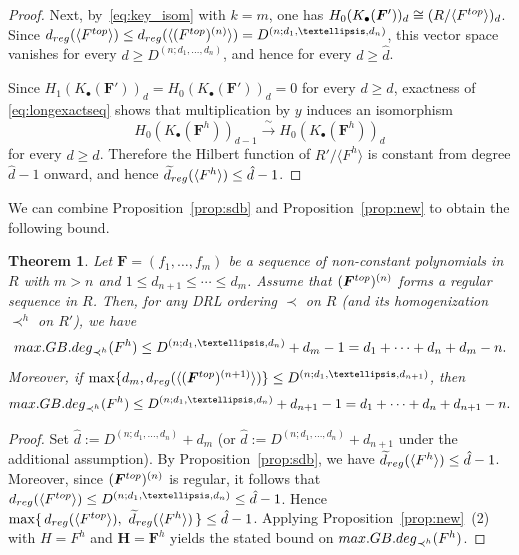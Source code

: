 \documentclass{article}
\newtheorem{theorem}{Theorem}[subsection]
\theoremstyle{definition}
\theoremstyle{plain}
\theoremstyle{plain}
\theoremstyle{plain}
\theoremstyle{plain}
\numberwithin{equation}{subsection}
\begin{document}
\begin{proof}
Next, by~\eqref{eq:key_isom} with $k=m$, one has $H_0(K_\bullet(\bm F'))_d \cong(R/\langle F^{\rm top}\rangle)_d$.
Since $d_{\rm reg}(\langle F^{\rm top}\rangle) \leq d_{\rm reg}(\langle(F^{\rm top})^{(n)}\rangle) = D^{(n;d_1,\ldots,d_n)}$, this vector space vanishes for every $d\geq D^{(n;d_1,\ldots,d_n)}$, and hence for every $d\geq\hat d$.

Since $H_1(K_\bullet(\bm F'))_d=H_0(K_\bullet(\bm F'))_d=0$ for every $d\geq\hat d$, exactness of \eqref{eq:longexactseq} shows that multiplication by $y$ induces an isomorphism
\[
H_0(K_\bullet(\bm F^h))_{d-1}\xrightarrow{\ \sim\ }H_0(K_\bullet(\bm F^h))_d
\]
for every $d\geq\hat d$.
Therefore the Hilbert function of $R'/\langle F^h\rangle$ is constant from degree $\hat d-1$ onward, and hence $\widetilde d_{\rm reg}(\langle F^h\rangle)\leq\hat d-1$.
\end{proof}

We can combine Proposition~\ref{prop:sdb} and Proposition~\ref{prop:new} to obtain the following bound.

\begin{theorem}\label{thm:maxGB}
Let $\bm{F} = (f_1,\ldots,f_m)$ be a sequence of non-constant polynomials in $R$ with $m>n$ and $1\leq d_{n+1} \leq \cdots \leq d_m$. 
Assume that $(\bm{F}^{\rm top})^{(n)}$ forms a regular sequence in $R$. 
Then, for any DRL ordering $\prec$ on $R$ (and its homogenization $\prec^h$ on $R'$), we have
\[
{\rm max.GB.deg}_{\prec^h}(F^h) \leq D^{(n;d_1,\ldots,d_n)}+d_m-1= d_1+\cdots+d_{n}+d_m-n.
\]
Moreover, if $\max\{d_m, d_{\rm reg}(\langle (\bm{F}^{\rm top})^{(n+1)}\rangle)\}\leq D^{(n;d_1,\ldots,d_{n+1})}$, then
\[
{\rm max.GB.deg}_{\prec^h}(F^h) \leq D^{(n;d_1,\ldots,d_n)}+d_{n+1}-1=d_1+\cdots+d_n+d_{n+1}-n.
\]
\end{theorem}

\begin{proof}
Set $\hat{d}:=D^{(n;d_1,\ldots,d_n)}+d_m$ (or $\hat{d}:=D^{(n;d_1,\ldots,d_n)}+d_{n+1}$ under the additional assumption).
By Proposition~\ref{prop:sdb}, we have $\widetilde{d}_{\rm reg}(\langle F^h\rangle)\le \hat{d}-1$.
Moreover, since $(\bm{F}^{\rm top})^{(n)}$ is regular, it follows that $d_{\rm reg}(\langle F^{\rm top}\rangle)\le D^{(n;d_1,\ldots,d_n)}\le \hat{d}-1$.
Hence $\max\{\,d_{\rm reg}(\langle F^{\rm top}\rangle),\ \widetilde{d}_{\rm reg}(\langle F^h\rangle)\,\} \le \hat{d}-1$.
Applying Proposition~\ref{prop:new}~{\rm (2)} with $H=F^h$ and $\bm H=\bm F^h$ yields the stated bound on ${\rm max.GB.deg}_{\prec^h}(F^h)$.
\end{proof}
\end{document}
